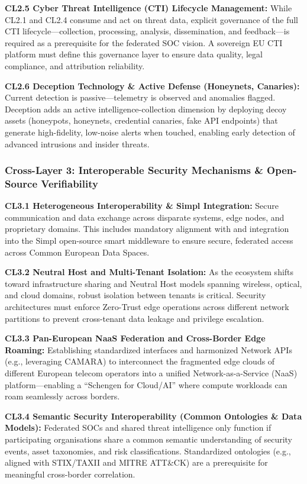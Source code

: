 \documentclass[12pt,a4paper]{report}
\begin{document}
\textbf{CL2.5 Cyber Threat Intelligence (CTI) Lifecycle Management:} While CL2.1 and CL2.4 consume and act on threat data, explicit governance of the full CTI lifecycle---collection, processing, analysis, dissemination, and feedback---is required as a prerequisite for the federated SOC vision. A sovereign EU CTI platform must define this governance layer to ensure data quality, legal compliance, and attribution reliability.

\textbf{CL2.6 Deception Technology \& Active Defense (Honeynets, Canaries):} Current detection is passive---telemetry is observed and anomalies flagged. Deception adds an active intelligence-collection dimension by deploying decoy assets (honeypots, honeynets, credential canaries, fake API endpoints) that generate high-fidelity, low-noise alerts when touched, enabling early detection of advanced intrusions and insider threats.

\subsubsection*{Cross-Layer 3: Interoperable Security Mechanisms \& Open-Source Verifiability}
\textbf{CL3.1 Heterogeneous Interoperability \& Simpl Integration:} Secure communication and data exchange across disparate systems, edge nodes, and proprietary domains. This includes mandatory alignment with and integration into the Simpl open-source smart middleware \cite{cloud_edge_roadmap} to ensure secure, federated access across Common European Data Spaces.

\textbf{CL3.2 Neutral Host and Multi-Tenant Isolation:} As the ecosystem shifts toward infrastructure sharing and Neutral Host models spanning wireless, optical, and cloud domains, robust isolation between tenants is critical. Security architectures must enforce Zero-Trust edge operations across different network partitions to prevent cross-tenant data leakage and privilege escalation.

\textbf{CL3.3 Pan-European NaaS Federation and Cross-Border Edge Roaming:} Establishing standardized interfaces and harmonized Network APIs (e.g., leveraging CAMARA) to interconnect the fragmented edge clouds of different European telecom operators into a unified Network-as-a-Service (NaaS) platform---enabling a ``Schengen for Cloud/AI'' where compute workloads can roam seamlessly across borders.

\textbf{CL3.4 Semantic Security Interoperability (Common Ontologies \& Data Models):} Federated SOCs and shared threat intelligence only function if participating organisations share a common semantic understanding of security events, asset taxonomies, and risk classifications. Standardized ontologies (e.g., aligned with STIX/TAXII and MITRE ATT\&CK) are a prerequisite for meaningful cross-border correlation.
\end{document}

